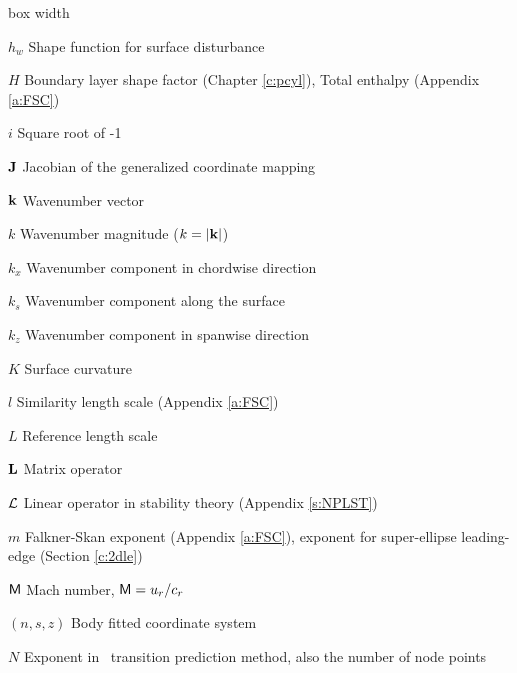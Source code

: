 \begin{descriptionlist}{box width}
\item[$h_w$]		Shape function for surface disturbance

\item[$H$]		Boundary layer shape factor (Chapter \ref{c:pcyl}),
                        Total enthalpy (Appendix \ref{a:FSC})

\item[$i$]              Square root of -1

\item[${\bf J}$]	Jacobian of the generalized coordinate mapping

\item[${\bf k}$]		Wavenumber vector

\item[$k$]		Wavenumber magnitude ($k = |{\bf k}|$)

\item[$k_x$]		Wavenumber component in chordwise direction

\item[$k_s$]		Wavenumber component along the surface

\item[$k_z$]		Wavenumber component in spanwise direction

\item[$K$]		Surface curvature

\item[$l$]		Similarity length scale
                        (Appendix \ref{a:FSC})

\item[$L$]              Reference length scale

\item[$\bf L$]		Matrix operator

\item[${\cal L}$]		Linear operator in stability theory 
                        (Appendix \ref{s:NPLST})

\item[$m$]		Falkner-Skan exponent (Appendix \ref{a:FSC}),
                        exponent for super-ellipse leading-edge 
                        (Section \ref{c:2dle})

\item[${\sf M}$]		Mach number, ${\sf M} = u_r / c_r$

\item[$(n, s, z)$]	Body fitted coordinate system

\item[$N$]		Exponent in \eton\ transition prediction method, also
                        the number of node points


\end{descriptionlist}
